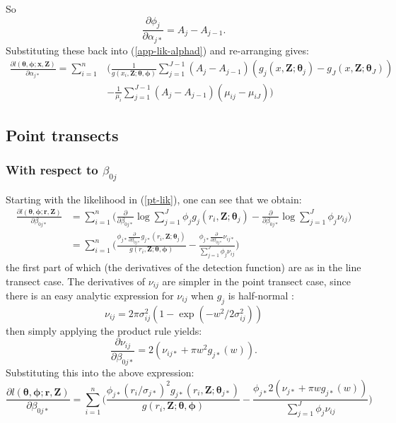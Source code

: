 \documentclass[useAMS,referee, usegraphicx]{biom}
\begin{document}
So
\begin{equation*}
\frac{\partial \phi_j}{\partial \alpha_{j*}} = A_j - A_{j-1}.
\end{equation*}
Substituting these back into (\ref{app-lik-alphad}) and re-arranging gives:
\begin{align*}
\frac{\partial l(\bm{\theta},\bm{\phi}; \mathbf{x},\mathbf{Z})}{\partial \alpha_{j*}} = \sum_{i=1}^n & \Big( \frac{1}{g(x_i,\mathbf{Z}; \bm{\theta},\bm{\phi})} \sum_{j=1}^{J-1} (A_j - A_{j-1}) (g_j(x,\mathbf{Z}; \bm{\theta}_j) - g_J(x,\mathbf{Z}; \bm{\theta}_J))\\
&- \frac{1}{\mu_i} \sum_{j=1}^{J-1}(A_j - A_{j-1})(\mu_{ij} - \mu_{iJ}) \Big)
\end{align*}


\subsection*{Point transects}

\subsubsection*{With respect to $\beta_{0j}$}

Starting with the likelihood in (\ref{pt-lik}), one can see that we obtain:
\begin{align*}
\frac{\partial l(\bm{\theta}, \bm{\phi}; \mathbf{r},\mathbf{Z})}{\partial \beta_{0j*}}  &= \sum_{i=1}^n \Big( \frac{\partial}{\partial \beta_{0j*}} \log \sum_{j=1}^J \phi_j g_j(r_i,\mathbf{Z}; \bm{\theta}_j) - \frac{\partial}{\partial \beta_{0j*}}\log \sum_{j=1}^J \phi_j \nu_{ij}\Big)\\
&= \sum_{i=1}^n \Big( \frac{ \phi_{j*} \frac{\partial}{\partial \beta_{0j*}}  g_{j*} (r_i,\mathbf{Z}; \bm{\theta}_j)}{g(r_i,\mathbf{Z}; \bm{\theta}, \bm{\phi})} - \frac{ \phi_{j*}\frac{\partial}{\partial \beta_{0j*}}  \nu_{ij*} }{ \sum_{j=1}^J \phi_j \nu_{ij}}\Big)
\end{align*}
the first part of which (the derivatives of the detection function) are as in the line transect case. The derivatives of $\nu_{ij}$ are simpler in the point transect case, since there is an easy analytic expression for $\nu_{ij}$ when $g_j$ is half-normal :
\begin{equation*}
\nu_{ij} = 2 \pi \sigma_{ij}^2 (1-\exp (-w^2/2\sigma_{ij}^2 ))
\end{equation*}
then simply applying the product rule yields:
\begin{equation*}
\frac{\partial \nu_{ij}}{\partial \beta_{0j*}} = 2 (\nu_{ij*} + \pi w^2 g_{j*}(w)).
\end{equation*}
Substituting this into the above expression:
\begin{equation*}
\frac{\partial l(\bm{\theta}, \bm{\phi}; \mathbf{r},\mathbf{Z})}{\partial \beta_{0j*}}  = \sum_{i=1}^n \Big( \frac{ \phi_{j*} (r_i/\sigma_{j*})^2 g_{j*}(r_i,\mathbf{Z}; \bm{\theta}_{j*})}{g(r_i,\mathbf{Z}; \bm{\theta}, \bm{\phi})} - \frac{ \phi_{j*} 2 (\nu_{j*} + \pi w g_{j*}(w)) }{ \sum_{j=1}^J \phi_j \nu_{ij}}\Big)
\end{equation*}
\end{document}

